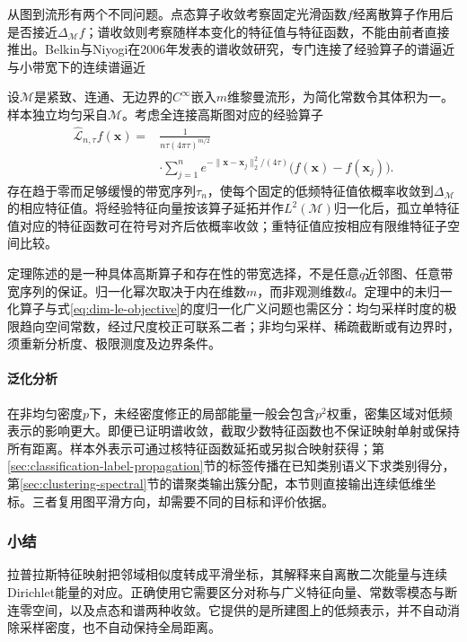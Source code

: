 从图到流形有两个不同问题。点态算子收敛考察固定光滑函数$f$经离散算子作用后是否接近$\Delta_{\mathcal{M}}f$；谱收敛则考察随样本变化的特征值与特征函数，不能由前者直接推出。Belkin与Niyogi在2006年发表的谱收敛研究，专门连接了经验算子的谱逼近与小带宽下的连续谱逼近

\begin{theorem}[一种定性的谱一致性结论]
  \label{thm:dim-le-spectral}
  设$\mathcal{M}$是紧致、连通、无边界的$C^\infty$嵌入$m$维黎曼流形，为简化常数令其体积为一。样本独立均匀采自$\mathcal{M}$。考虑全连接高斯图对应的经验算子
  \[
    \begin{aligned}
      \widehat{\mathcal{L}}_{n,\tau}f(\bm{x})
      ={}&\frac{1}{n\tau(4\pi\tau)^{m/2}}\\
      &\cdot\sum_{j=1}^n
        e^{-\lVert\bm{x}-\bm{x}_j\rVert_2^2/(4\tau)}
        \bigl(f(\bm{x})-f(\bm{x}_j)\bigr).
    \end{aligned}
  \]
  存在趋于零而足够缓慢的带宽序列$\tau_n$，使每个固定的低频特征值依概率收敛到$\Delta_{\mathcal{M}}$的相应特征值。将经验特征向量按该算子延拓并作$L^2(\mathcal{M})$归一化后，孤立单特征值对应的特征函数可在符号对齐后依概率收敛；重特征值应按相应有限维特征子空间比较。
\end{theorem}

定理陈述的是一种具体高斯算子和存在性的带宽选择，不是任意$q$近邻图、任意带宽序列的保证。归一化幂次取决于内在维数$m$，而非观测维数$d$。定理中的未归一化算子与式\eqref{eq:dim-le-objective}的度归一化广义问题也需区分：均匀采样时度的极限趋向空间常数，经过尺度校正可联系二者；非均匀采样、稀疏截断或有边界时，须重新分析度、极限测度及边界条件。

\paragraph{泛化分析}

在非均匀密度$p$下，未经密度修正的局部能量一般会包含$p^2$权重，密集区域对低频表示的影响更大。即便已证明谱收敛，截取少数特征函数也不保证映射单射或保持所有距离。样本外表示可通过核特征函数延拓或另拟合映射获得；第\ref{sec:classification-label-propagation}节的标签传播在已知类别语义下求类别得分，第\ref{sec:clustering-spectral}节的谱聚类输出簇分配，本节则直接输出连续低维坐标。三者复用图平滑方向，却需要不同的目标和评价依据。

\subsubsection{小结}

拉普拉斯特征映射把邻域相似度转成平滑坐标，其解释来自离散二次能量与连续Dirichlet能量的对应。正确使用它需要区分对称与广义特征向量、常数零模态与断连零空间，以及点态和谱两种收敛。它提供的是所建图上的低频表示，并不自动消除采样密度，也不自动保持全局距离。

